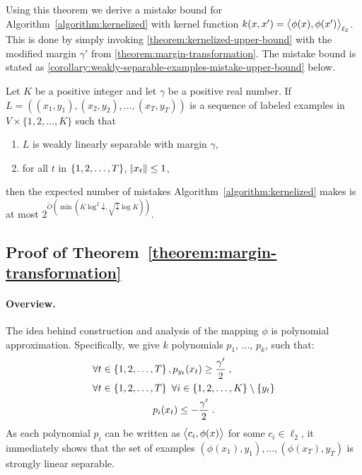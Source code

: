 Using this theorem we derive a mistake bound for
Algorithm~\ref{algorithm:kernelized} with kernel function $k(x,x') =
\left\langle \phi(x), \phi(x') \right\rangle_{\ell_2}$. This is done by simply invoking
\autoref{theorem:kernelized-upper-bound} with the modified margin $\gamma'$ from
\autoref{theorem:margin-transformation}. The mistake bound is stated as
\autoref{corollary:weakly-separable-examples-mistake-upper-bound} below.

\begin{corollary}
\label{corollary:weakly-separable-examples-mistake-upper-bound}
Let $K$ be a positive integer and let $\gamma$ be a positive real number. If $L
= ((x_1, y_1), (x_2, y_2), \dots, (x_T, y_T))$ is a sequence of labeled examples
in $V \times \{1,2,\dots,K\}$ such that
\begin{enumerate}
\item $L$ is weakly linearly separable with margin $\gamma$,
\item for all $t$ in $\cbr{1,2,\dots,T}$, $\norm{x_t} \le 1$,
\end{enumerate}
then the expected number of mistakes Algorithm~\ref{algorithm:kernelized} makes
is at most $2^{\widetilde{O}(\min(K \log^2 \frac{1}{\gamma},
\sqrt{\frac{1}{\gamma}} \log K))}$.
\end{corollary}

\subsection{Proof of Theorem~\ref{theorem:margin-transformation}}
\label{section:margin-transformation}

\paragraph{Overview.} The idea behind construction and analysis of the mapping
$\phi$ is polynomial approximation. Specifically, we give $k$ polynomials $p_1$,
$\ldots$, $p_k$, such that:
\begin{align}
\label{equation:poly-pos}
& \forall t \in \cbr{1,2,\dots,T}, p_{y_t}(x_t) \ge \frac{\gamma'}2 \; ,
\\
\label{equation:poly-neg}
& \begin{gathered}
\forall t \in \cbr{1,2,\dots,T} \ \forall i \in \cbr{1,2,\ldots,K} \setminus \cbr{y_t} \\
p_i(x_t) \leq -\frac{\gamma'}2 \; .
\end{gathered}
\end{align}
As each polynomial $p_i$ can be written as $\left\langle c_i, \phi(x) \right\rangle$ for some $c_i \in
\ell_2$, it immediately shows that the set of examples $(\phi(x_1),y_1), \ldots,
(\phi(x_T),y_T)$ is strongly linear separable.

